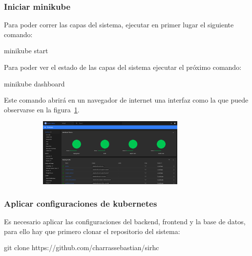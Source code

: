 \documentclass[twoside]{article}
\begin{document}
\subsubsection{Iniciar minikube}
Para poder correr las capas del sistema, ejecutar en primer lugar el siguiente comando:

minikube start

Para poder ver el estado de las capas del sistema ejecutar el próximo comando:

minikube dashboard

Este comando abrirá en un navegador de internet una interfaz como la que puede observarse en la figura~\ref{fig:kubernetesDashboard}.
\begin{figure}[H]
	\caption{Interfaz del dashboard de Kubernetes}
    \begin{subfigure}{1\textwidth}
	\includegraphics[width=0.8\textwidth]{kubernetesDashboard.png}
    \end{subfigure}
	\label{fig:kubernetesDashboard}
\end{figure}
\vspace{-1.0\baselineskip}

\subsubsection{Aplicar configuraciones de kubernetes}
Es necesario aplicar las configuraciones del backend, frontend y la base de datos, para ello hay que primero clonar el repositorio del sistema:

git clone https://github.com/charrassebastian/sirhc
\end{document}

